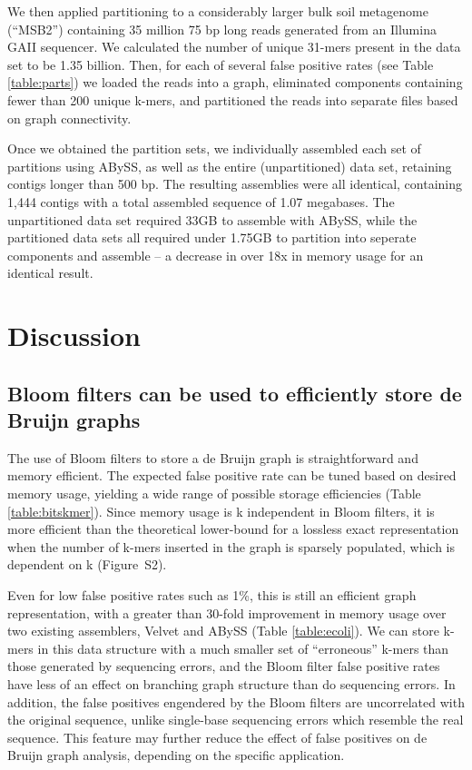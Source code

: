 \documentclass{pnastwo}
\begin{document}
\begin{article}
We then applied partitioning to a considerably larger bulk soil
metagenome (``MSB2'') containing 35 million 75 bp long reads generated
from an Illumina GAII sequencer.  We calculated the number of unique
31-mers present in the data set to be 1.35 billion. Then, for each of
several false positive rates (see Table \ref{table:parts}) we loaded
the reads into a graph, eliminated components containing fewer than
200 unique k-mers, and partitioned the reads into separate files based
on graph connectivity.

Once we obtained the partition sets, we individually assembled each
set of partitions using ABySS, as well as the entire (unpartitioned) 
data set,
retaining contigs longer than 500 bp.  The resulting assemblies were
all identical, containing 1,444 contigs with a total assembled
sequence of 1.07 megabases.  The unpartitioned data set required 33GB to
assemble with ABySS, while the partitioned data sets all required
under 1.75GB to partition into seperate components and assemble -- 
a decrease in over 18x
in memory usage for an identical result.


\section{Discussion}


\subsection{Bloom filters can be used to efficiently store de Bruijn graphs}

The use of Bloom filters to store a de Bruijn graph is
straightforward and memory efficient.  The expected false positive
rate can be tuned based on desired memory usage,
yielding a wide range of possible storage efficiencies
(Table \ref{table:bitskmer}). Since memory usage is k independent 
in Bloom filters, it is more efficient than the theoretical lower-bound 
for a lossless exact representation when the number of k-mers inserted 
in the graph is sparsely populated, which is dependent on k (Figure~S2).

Even for low false positive rates such as 1\%, this is still an
efficient graph representation, with a greater than 30-fold
improvement in memory usage over two existing assemblers, Velvet and
ABySS (Table \ref{table:ecoli}).  We can store k-mers in this data structure with a much smaller
set of ``erroneous'' k-mers than those generated by sequencing errors,
and the Bloom filter false positive rates have less of an effect on
branching graph structure than do sequencing errors.  In addition, the
false positives engendered by the Bloom filters are uncorrelated with
the original sequence, unlike single-base sequencing errors which resemble
the real sequence.  This feature may further
reduce the effect of false positives on de Bruijn graph analysis,
depending on the specific application.


\end{article}
\end{document}
